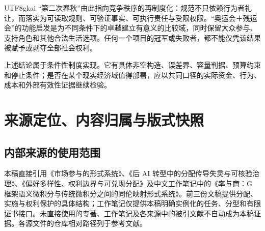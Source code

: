 \documentclass[12pt,a4paper,openany]{report}
\begin{document}
\begin{CJK*}{UTF8}{gkai}
“第二次春秋”由此指向竞争秩序的再制度化：规范不只依赖行为者礼让，而落实为可读取规则、可验证事实、可执行责任与受限权限。“奥运会＋残运会”的功能启发是为不同条件下的卓越建立有意义的比较域，同时保留大众参与、支持角色和其他合法生活选项。任何一个项目的冠军或失败者，都不能仅凭该结果被赋予或剥夺全部社会权利。

上述结论属于条件性制度实现。它有具体非空构造、误差界、容量判据、预算约束和停止条件；是否在某个现实经济域值得部署，应以共同口径的实际资金、行为、成本和外部有效性证据继续检验。
\appendix
\chapter{来源定位、内容归属与版式快照}
\label{app:sources}
\section{内部来源的使用范围}
本稿直接引用《市场参与的形式系统》\cite{SourceMarket}、《后 AI 转型中的分配传导失灵与可核验治理》\cite{SourceSupplement}、《偏好多样性、权利边界与可兑现分配》\cite{SourcePreference}及中文工作笔记中的《率与商：G 框架语义微积分与传统微积分之间的同伦映射形式系统》\cite{SourceRateQuotient}。前三份文稿提供分配、实施与权利保护的具体结构；工作笔记仅提供本稿明确实例化的任务、分型和有限证书接口。未直接使用的专著、工作笔记及各来源中的被引文献不自动成为本稿证据。各源文件的仓库相对路径列于参考文献。


\end{CJK*}
\end{document}
